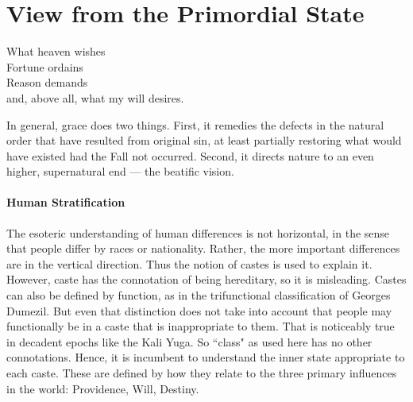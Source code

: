 \section{View from the Primordial State}

\begin{quotex}
What heaven wishes\\
Fortune ordains\\
Reason demands\\
and, above all, what my will desires. 

In general, grace does two things. First, it remedies the defects in the natural order that have resulted from original sin, at least partially restoring what would have existed had the Fall not occurred. Second, it directs nature to an even higher, supernatural end — the beatific vision.

\end{quotex}
\paragraph{Human Stratification}
The esoteric understanding of human differences is not horizontal, in the sense that people differ by races or nationality. Rather, the more important differences are in the vertical direction. Thus the notion of castes is used to explain it. However, caste has the connotation of being hereditary, so it is misleading. Castes can also be defined by function, as in the trifunctional classification of Georges Dumezil. But even that distinction does not take into account that people may functionally be in a caste that is inappropriate to them. That is noticeably true in decadent epochs like the Kali Yuga. So ``class" as used here has no other connotations. Hence, it is incumbent to understand the inner state appropriate to each caste. These are defined by how they relate to the three primary influences in the world: Providence, Will, Destiny.

